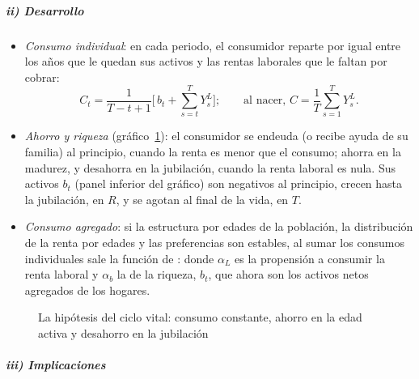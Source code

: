 \documentclass[11pt]{article}
\begin{document}
\subparagraph{ii) Desarrollo}

\begin{itemize}
\item \emph{Consumo individual}: en cada periodo, el consumidor reparte por igual entre los años que le quedan sus activos y las rentas laborales que le faltan por cobrar:
  \begin{equation}
  C_t=\frac{1}{T-t+1}\Big[\,b_t+\sum_{s=t}^{T}Y^L_s\Big];\qquad\text{al nacer, }C=\frac{1}{T}\sum_{s=1}^{T}Y^L_s.\label{eq:ciclo-vital-individual}
  \end{equation}
\item \emph{Ahorro y riqueza} (gráfico~\ref{fig:ciclo-vital}): el consumidor se endeuda (o recibe ayuda de su familia) al principio, cuando la renta es menor que el consumo; ahorra en la madurez, y desahorra en la jubilación, cuando la renta laboral es nula. Sus activos $b_t$ (panel inferior del gráfico) son negativos al principio, crecen hasta la jubilación, en $R$, y se agotan al final de la vida, en $T$.
\item \emph{Consumo agregado}: si la estructura por edades de la población, la distribución de la renta por edades y las preferencias son estables, al sumar los consumos individuales sale la función de \textcite{AndoModigliani1963Life}:
  donde $\alpha_L$ es la propensión a consumir la renta laboral y $\alpha_b$ la de la riqueza, $b_t$, que ahora son los activos netos agregados de los hogares.
\end{itemize}

\begin{figure}[H]
\centering
\caption{La hipótesis del ciclo vital: consumo constante, ahorro en la edad activa y desahorro en la jubilación}\label{fig:ciclo-vital}
\end{figure}

\subparagraph{iii) Implicaciones}
\end{document}
